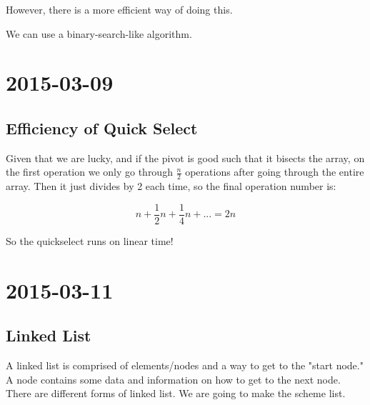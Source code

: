 \documentclass [12 pt, twoside] {article}
\begin{document}
However, there is a more efficient way of doing this.

We can use a binary-search-like algorithm. 

\section{2015-03-09}
\subsection{Efficiency of Quick Select}

Given that we are lucky, and if the pivot is good such that it bisects the
array, on the first operation we only go through $\frac{n}{2}$ operations after
going through the entire array. Then it just divides by 2 each time, so the
final operation number is:

$$n + \frac{1}{2}n + \frac{1}{4}n + ... = 2n$$

So the quickselect runs on linear time!

\section{2015-03-11}
\subsection{Linked List}

A linked list is comprised of elements/nodes and a way to get to the "start
node." A node contains some data and information on how to get to the next
node. There are different forms of linked list. We are going to make the scheme
list.
\end{document}
